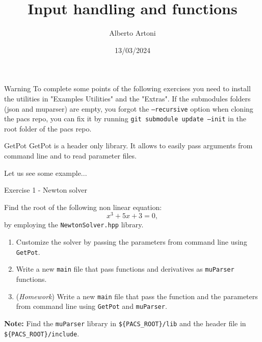 \documentclass[10pt,aspectratio=169]{beamer}
\begin{document}
    \title{Input handling and functions}
    \author{Alberto Artoni}
    \date{13/03/2024}
    
\begin{frame}
    \maketitle
\end{frame}

\begin{frame}{Warning}
    To complete some points of the following exercises you need to install the utilities in "Examples Utilities" and the "Extras". If the submodules folders (json and muparser) are empty, you forgot the \texttt{--recursive} option when cloning the pacs repo, you can fix it by running \texttt{git submodule update --init} in the root folder of the pacs repo.
\end{frame}


\begin{frame}{GetPot}
	GetPot is a header only library. It allows to easily pass arguments from command line and to read parameter files.
	
	\medskip
	Let us see some example...
\end{frame}

\begin{frame}{Exercise 1 - Newton solver}

Find the root of the following non linear equation:
\begin{equation*}
	x^3 + 5 x + 3 = 0,
\end{equation*}	
by employing the \texttt{NewtonSolver.hpp} library.
\medskip
	
	\begin{enumerate}
\item Customize the solver by passing the parameters from command line using \texttt{GetPot}. \\
\item  Write a new \texttt{main} file that pass functions and derivatives as \texttt{muParser} functions. \\
\item (\textit{Homework}) Write a new \texttt{main} file that pass the function and the parameters from command line using \texttt{GetPot} and \texttt{muParser}.
\end{enumerate}

\textbf{Note: } Find the \texttt{muParser} library in \texttt{\$\{PACS\_ROOT\}/lib} and the header file in  \texttt{\$\{PACS\_ROOT\}/include}.

\end{frame}
\end{document}
